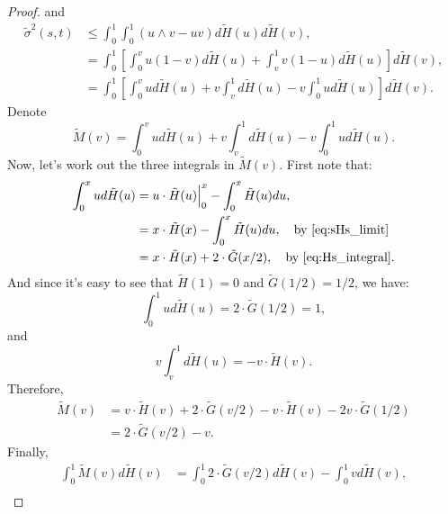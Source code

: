 \begin{proof}
	and 
	\begin{equation*}
	\begin{aligned}
	\tilde{\sigma}^2(s,t) &\le \int_{0}^{1} \int_{0}^{1} (u \wedge v -uv) d \tilde{H}(u) d \tilde{H}(v),\\
	&= \int_{0}^{1} \left[\int_{0}^{v} u(1-v) d\tilde{H}(u) + \int_{v}^{1} v(1-u) d\tilde{H}(u)   \right]  d\tilde{H}(v),\\
	&= \int_{0}^{1} \left[\int_{0}^{v} u d\tilde{H}(u) + v\int_{v}^{1} d\tilde{H}(u) -v\int_{0}^{1}u d\tilde{H}(u)  \right]  d\tilde{H}(v).
	\end{aligned}
	\end{equation*}
	Denote 
	\begin{equation*}
	\tilde{M}(v) = \int_{0}^{v} u d\tilde{H}(u) + v\int_{v}^{1} d\tilde{H}(u) -v\int_{0}^{1}u d\tilde{H}(u).
	\end{equation*}
	Now, let's work out the three integrals in $\tilde{M}(v)$. First note that:
	\begin{equation*}
	\begin{aligned}
	\int_{0}^{x} u d\tilde{H}(u) &= u\cdot \tilde{H}(u) \Bigr|_{0}^x - \int_{0}^{x} \tilde{H}(u) du,\\
	&= x\cdot \tilde{H}(x) - \int_{0}^{x} \tilde{H}(u) du,\quad \text{by \eqref{eq:sHs_limit}}\\
	&=  x\cdot \tilde{H}(x) + 2\cdot \tilde{G}(x/2), \quad \text{by \eqref{eq:Hs_integral}}.
	\end{aligned}
	\end{equation*}
	And since it's easy to see that $\tilde{H}(1)=0$ and $\tilde{G}(1/2)=1/2$, we have:
	\begin{equation*}
	\int_{0}^{1} u d\tilde{H}(u) = 2\cdot \tilde{G}(1/2)=1,
	\end{equation*}
	and
	\begin{equation*}
	v\int_{v}^{1} d\tilde{H}(u) = -v\cdot \tilde{H}(v).
	\end{equation*}
	Therefore,
	\begin{equation*}
	\begin{aligned}
	\tilde{M}(v) &= v\cdot \tilde{H}(v) +2 \cdot \tilde{G}(v/2)-v\cdot \tilde{H}(v)-2v\cdot \tilde{G}(1/2)\\
	&=2 \cdot \tilde{G}(v/2) - v.
	\end{aligned}
	\end{equation*}
	Finally,
	\begin{equation*}
	\begin{aligned}
	\int_{0}^{1} \tilde{M}(v) d\tilde{H}(v) &= \int_{0}^{1} 2 \cdot \tilde{G}(v/2)d\tilde{H}(v) - \int_{0}^{1}v d\tilde{H}(v),\\

\end{aligned}
\end{equation*}
\end{proof}
